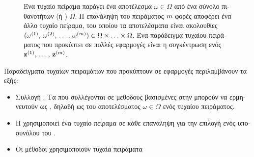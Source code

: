 {{\begin{figure}[H]
\begin{center}
	     	\end{center}
		{
		\caption{\foreignlanguage{greek}{Ένα τυχαίο πείραμα παράγει ένα αποτέλεσμα $\omega \in \Omega$ από ένα σύνολο πιθανοτήτων 
		(ή} ) $\Omega$. \foreignlanguage{greek}{Η επανάληψη του πειράματος $m$ φορές αποφέρει 
		ένα άλλο τυχαίο πείραμα, του οποίου τα αποτελέσματα είναι ακολουθίες 
		$(\omega^{(1)}, \,\omega^{(2)}, \,\dots, \,\omega^{(m)}) \in \Omega\times\ldots\times \Omega$. 
		Ένα παράδειγμα τυχαίου πειράματος που προκύπτει σε πολλές εφαρμογές}  \foreignlanguage{greek}{είναι 
		η συγκέντρωση ενός}  ${\bf z}^{(1)},\,\ldots,\,{\bf z}^{(m)}$.} }
	 	\end{figure} 
	 	\foreignlanguage{greek}{Παραδείγματα τυχαίων πειραμάτων που προκύπτουν σε εφαρμογές}  
		\foreignlanguage{greek}{περιλαμβάνουν τα εξής:} 
	 	\begin{itemize} 
			\item \foreignlanguage{greek}{Συλλογή} : \foreignlanguage{greek}{Τα}  
			\foreignlanguage{greek}{που συλλέγονται σε μεθόδους βασισμένες στην}  \foreignlanguage{greek}{μπορούν 
			να ερμηνευτούν ως} , \foreignlanguage{greek}{δηλαδή ως}  \foreignlanguage{greek}{του 
			αποτελέσματος $\omega \in \Omega$ ενός τυχαίου πειράματος.}
			\item \foreignlanguage{greek}{Η}  \foreignlanguage{greek}{χρησιμοποιεί ένα τυχαίο πείραμα σε κάθε 
			επανάληψη για την επιλογή ενός υποσυνόλου του} . 
			\item \foreignlanguage{greek}{Οι μέθοδοι}  \foreignlanguage{greek}{χρησιμοποιούν τυχαία πειράματα 
}
\end{itemize}}}
